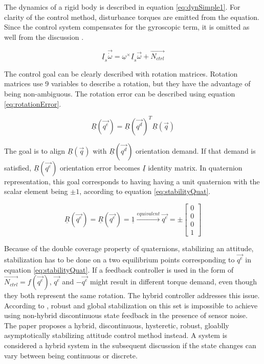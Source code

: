 The dynamics of a rigid body is described in equation \ref{eq:dynSimple1}. For clarity of the control method, disturbance torques are emitted from the equation. Since the control system compensates for the gyroscopic term, it is omitted as well from the discussion .

\begin{equation}
\label{eq:dynSimple1}
\underline{I}_s \vec{\dot{\omega}} = \underline{\omega}^\times \underline{I}_s \vec{\omega} + \vec{N_{ctrl}}
\end{equation}

The control goal can be clearly described with rotation matrices. Rotation matrices use 9 variables to describe a rotation, but they have the advantage of being non-ambiguous. The rotation error can be described using equation \ref{eq:rotationError}. 

\begin{equation}
\label{eq:rotationError}
\underline{R}(\vec{q^e}) = \underline{R}(\vec{q^d})^T \underline{R}(\vec{q})
\end{equation}

The goal is to align $\underline{R}(\vec{q})$ with $\underline{R}(\vec{q^d})$ orientation demand. If that demand is satisfied, $\underline{{R}}(\vec{q^e})$ orientation error becomes $\underline{I}$ identity matrix. In quaternion representation, this goal corresponds to having having a unit quaternion with the scalar element being $\pm 1$, according to equation \ref{eq:stabilityQuat}. 

\begin{equation}
\label{eq:stabilityQuat}
\underline{R}(\vec{q^e}) = \underline{R}(\vec{q^e}) = \underline{1} \xrightarrow{equivalent} \vec{q^e}  = \pm	\begin{bmatrix}
0 \\
0 \\
0 \\
1
\end{bmatrix} 	
\end{equation}

Because of the double coverage property of quaternions, stabilizing an attitude, stabilization has to be done on a two equilibrium points corresponding to $\vec{q^e}$ in equation \ref{eq:stabilityQuat}. If a feedback controller is used in the form of $\vec{N_{ctrl}} = f(\vec{q^e})$, $\vec{q^e}$ and $-\vec{q^e}$ might result in different torque demand, even though they both represent the same rotation. The hybrid controller addresses this issue. According to \cite{globalAttController}, robust and global stabilization on this set is impossible to achieve using non-hybrid discontinuous state feedback in the presence of sensor noise. The paper proposes a hybrid, discontinuous, hysteretic, robust, gloablly asymptotically stabilizing attitude control method instead. A system is considered a hybrid system in the subsequent discussion if the state changes can vary between being continuous or discrete.

